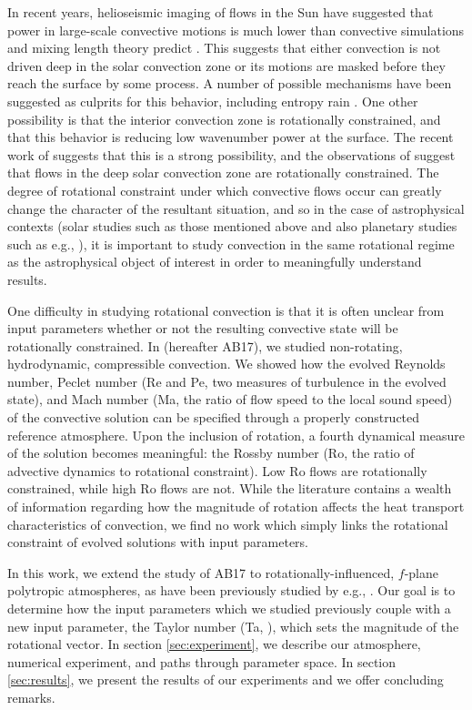 \documentclass[twocolumn, amsmath, amsfonts, amssymb]{aastex62}
\begin{document}
In recent years, helioseismic imaging of flows in the Sun have suggested that
power in large-scale convective motions is much lower than convective simulations
and mixing length theory predict \citep{hanasoge&all2012, greer&all2015L}.
This suggests that either convection is not driven deep in the solar convection
zone or its motions are masked before they reach the surface by some process.
A number of possible mechanisms have been suggested as culprits for this behavior,
including entropy rain \citep{brandenburg2016}. One other possibility is that the
interior convection zone is rotationally constrained, and that this behavior is
reducing low wavenumber power at the surface. The recent work of
\cite{featherstone&hindman2016} suggests that this is a strong possibility,
and the observations of \cite{greer&all2016} suggest that flows in the deep solar
convection zone are rotationally constrained. The degree of rotational constraint
under which convective flows occur can greatly change the character of the
resultant situation, and so in the case of astrophysical contexts (solar studies
such as those mentioned above and also planetary studies such as e.g., 
\cite{soderlund&all2015}), it is important to study convection in the same
rotational regime as the astrophysical object of interest in order to meaningfully
understand results.

One difficulty in studying rotational convection is that it is often unclear
from input parameters whether or not the resulting convective state will be rotationally
constrained. In \cite{anders&brown2017} (hereafter AB17), we studied non-rotating, hydrodynamic, 
compressible convection. We showed how the evolved Reynolds number, Peclet number
(Re and Pe, two measures of turbulence in the evolved state), and Mach number
(Ma, the ratio of flow speed to the local sound speed) of the convective solution
can be specified through a properly constructed reference atmosphere. Upon the inclusion
of rotation, a fourth dynamical measure of the solution becomes meaningful: the
Rossby number (Ro, the ratio of advective dynamics to rotational constraint). Low
Ro flows are rotationally constrained, while high Ro flows are not. While the literature
contains a wealth of information regarding how the magnitude of rotation affects the
heat transport characteristics of convection, we find no work which simply links
the rotational constraint of evolved solutions with input parameters.

In this work, we extend the study of AB17 to rotationally-influenced, $f$-plane
polytropic atmospheres, as have been previously studied by e.g.,
\cite{brummell&all1996, brummell&all1998, calkins&all2015a}. Our goal is to determine
how the input parameters which we studied previously couple with a new input
parameter, the Taylor number (Ta, \cite{julien&all1996}), which sets the magnitude of the
rotational vector. In section  \ref{sec:experiment}, we describe our atmosphere, numerical
experiment, and paths through parameter space. In section \ref{sec:results}, we present
the results of our experiments and we offer concluding remarks.
\end{document}
